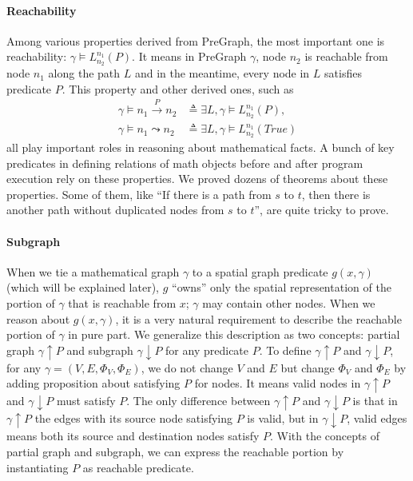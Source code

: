 \paragraph{Reachability}
Among various properties derived from PreGraph, the most important one
is reachability: $\gamma \models L_{n_2}^{n_1}(P)$. It means in
PreGraph $\gamma$, node $n_2$ is reachable from node $n_1$ along the
path $L$ and in the meantime, every node in $L$ satisfies predicate
$P$. This property and other derived ones, such as
\begin{equation*}
\begin{split}
\gamma\models n_1 \xrightarrow{P} n_2 &\triangleq \exists L, \gamma \models L_{n_2}^{n_1}(P),\\
\gamma\models n_1 \leadsto n_2 &\triangleq \exists L, \gamma \models L_{n_2}^{n_1}(True)
\end{split}
\end{equation*}
all play important roles in reasoning about mathematical facts. A
bunch of key predicates in defining relations of math objects before
and after program execution rely on these properties. We proved dozens
of theorems about these properties. Some of them, like ``If there is a
path from $s$ to $t$, then there is another path without duplicated
nodes from $s$ to $t$'', are quite tricky to prove.

\paragraph{Subgraph}
When we tie a mathematical graph $\gamma$ to a spatial graph predicate
$g(x, \gamma)$ (which will be explained later), $g$ ``owns'' only the
spatial representation of the portion of $\gamma$ that is reachable
from $x$; $\gamma$ may contain other nodes. When we reason about
$g(x, \gamma)$, it is a very natural requirement to describe the
reachable portion of $\gamma$ in pure part. We generalize this
description as two concepts: partial graph $\gamma \uparrow P$ and
subgraph $\gamma \downarrow P$ for any predicate $P$. To define
$\gamma \uparrow P$ and $\gamma \downarrow P$, for any $\gamma=(V,
E, \Phi_V, \Phi_E)$, we do not change $V$ and $E$ but change $\Phi_V$
and $\Phi_E$ by adding proposition about satisfying $P$ for nodes. It
means valid nodes in $\gamma \uparrow P$ and $\gamma \downarrow P$
must satisfy $P$. The only difference between $\gamma \uparrow P$ and
$\gamma \downarrow P$ is that in $\gamma \uparrow P$ the edges with
its source node satisfying $P$ is valid, but in $\gamma \downarrow P$,
valid edges means both its source and destination nodes satisfy
$P$. With the concepts of partial graph and subgraph, we can express
the reachable portion by instantiating $P$ as reachable predicate.

